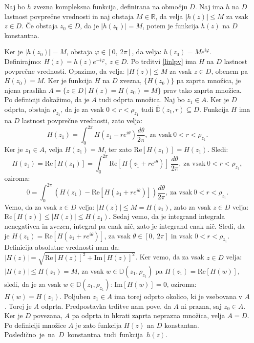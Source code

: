 \documentclass[mat1]{fmfdelo}
\begin{document}
    \begin{trditev}
        \label{pm_lpv}
        Naj bo $h$ zvezna kompleksna funkcija, definirana na območju $D$. Naj ima $h$ na $D$ lastnost povprečne vrednosti in naj obstaja $M \in \mathbb{R}$, da velja $|h(z)| \leq M$ za vsak $z \in D$. 
        Če obstaja $z_0 \in D$, da je $|h(z_0)| = M$, potem je funkcija $h(z)$ na $D$ konstantna. 
    \end{trditev}
    \begin{dokaz}
        Ker je $|h(z_0)| = M$, obstaja $\varphi \in [0,~2\pi]$, da velja: \mbox{$h(z_0) = M e^{i \varphi}$}.
        Definirajmo: $H(z) = h(z) e^{-i\varphi},~z \in D$. Po trditvi \ref{linlpv} ima $H$ na $D$ lastnost povprečne vrednosti. Opazimo, da velja: $|H(z)|  \leq M$ za vsak $z \in D$, obenem pa \mbox{$H(z_0) = M$}.
        Ker je funkcija $H$ na $D$ zvezna, $\{H(z_0)\}$ pa zaprta množica, je njena praslika \mbox{$A = \{z \in D~|~H(z) = H(z_0) = M\}$} prav tako zaprta množica. Po definiciji dokažimo, da je $A$ tudi odprta množica. 
        Naj bo $z_1 \in A$. Ker je $D$ odprta, obstaja $\rho_{z_1}$, da je za vsak $0 < r < \rho_{z_1}$ tudi $\overline{\mathbb{D}}(z_1, r) \subseteq D$. 
        Funkcija $H$ ima na $D$ lastnost povprečne vrednosti, zato velja:
        $$
            H(z_1) = \int_{0}^{2\pi}{H(z_1 + re^{i\theta}) \frac{d\theta}{2\pi}},~\text{za vsak}~0<r<\rho_{z_1}.
        $$
        Ker je $z_1 \in A$, velja $H(z_1) = M$, ter zato $\text{Re}[H(z_1)] = H(z_1)$. 
        Sledi:
        $$
        H(z_1) = \text{Re}[H(z_1)] = \int_{0}^{2\pi}{\text{Re}[H(z_1 + re^{i\theta})]~\frac{d\theta}{2\pi}},~\text{za vsak}~0<r<\rho_{z_1},
        $$
        oziroma:
        $$
        0 = \int_{0}^{2\pi}{\left(H(z_1) - \text{Re}[H(z_1 + re^{i\theta})] \right)\frac{d\theta}{2\pi}},~\text{za vsak}~0<r<\rho_{z_1}.
        $$
        Vemo, da za vsak $z \in D$ velja: $|H(z)| \leq M = H(z_1)$, zato za vsak $z \in D$ velja: $\text{Re}[H(z)] \leq |H(z)| \leq H(z_1)$.
        Sedaj vemo, da je integrand integrala nenegativen in zvezen, integral pa enak nič, zato je integrand enak nič. 
        Sledi, da je \mbox{$H(z_1) = \text{Re}[H(z_1 + r e^{i \theta})]$}, za vsak $\theta \in [0,~2\pi]$ in vsak $0 < r < \rho_{z_1}$. Definicija absolutne vrednosti nam da: $|H(z)| = \sqrt{\text{Re}[H(z)]^2 + \text{Im}[H(z)]^2}$. 
        Ker vemo, da za vsak $z \in D$ velja: $|H(z)| \leq H(z_1) = M$, za vsak $w \in \mathbb{D}(z_1,\rho_{z_1})$ pa $H(z_1) = \text{Re}[H(w)]$, sledi, da je za vsak $w \in \mathbb{D}(z_1,\rho_{z_1})$: $\text{Im}[H(w)] = 0$, oziroma: $H(w) = H(z_1)$. 
        Poljuben $z_1 \in A$ ima torej odprto okolico, ki je vsebovana v $A$. Torej je $A$ odprta.
        Predpostavka trditve nam pove, da $A$ ni prazna, saj $z_0 \in A$. Ker je $D$ povezana, $A$ pa odprta in hkrati zaprta neprazna množica, velja $A = D$. 
        Po definiciji množice $A$ je zato funkcija $H(z)$ na $D$ konstantna. \mbox{Posledično je na $D$ konstantna tudi funkcija $h(z)$.} 
    \end{dokaz}
\end{document}
